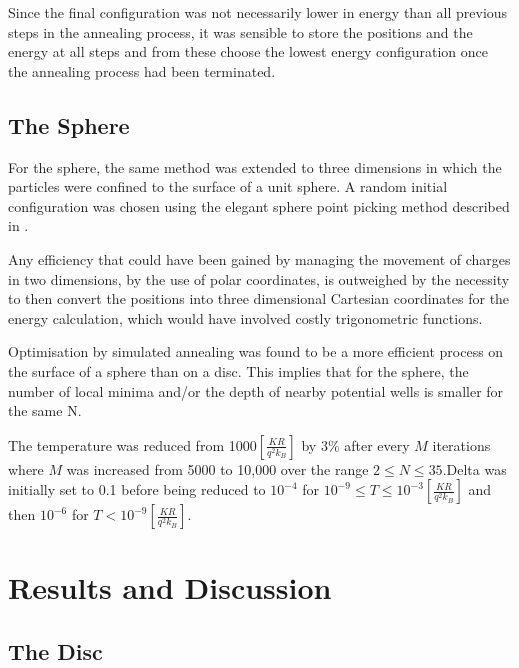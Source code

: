 \documentclass[12pt,a4paper,final]{iopart}
\begin{document}
{Since the final configuration was not necessarily lower in energy than all previous steps in the annealing process, it was sensible to store the positions and the energy at all steps and from these choose the lowest energy configuration once the annealing process had been terminated.

\subsection{The Sphere}

For the sphere, the same method was extended to three dimensions in which the particles were confined to the surface of a unit sphere. A random initial configuration was chosen using the elegant sphere point picking method described in \cite{marsaglia72}.

Any efficiency that could have been gained by managing the movement of charges in two dimensions, by the use of polar coordinates, is outweighed by the necessity to then convert the positions into three dimensional Cartesian coordinates for the energy calculation, which would have involved costly trigonometric functions. 

Optimisation by simulated annealing was found to be a more efficient process on the surface of a sphere than on a disc. This implies that for the sphere, the number of local minima and/or the depth of nearby potential wells is smaller for the same N. 

The temperature was reduced from 1000$\left[\frac{KR}{q^2 k_B}\right]$ by $3\%$ after every $M$ iterations where $M$ was increased from 5000 to 10,000 over the range $2 \leq N \leq 35$.Delta was initially set to 0.1 before being reduced to $10^{-4}$ for $10^{-9} \leq T \leq 10^{-3}\left[\frac{KR}{q^2 k_B}\right]$ and then $10^{-6}$ for $T<10^{-9}\left[\frac{KR}{q^2 k_B}\right]$.

\section{Results and Discussion}

\subsection{The Disc}


}
\end{document}

